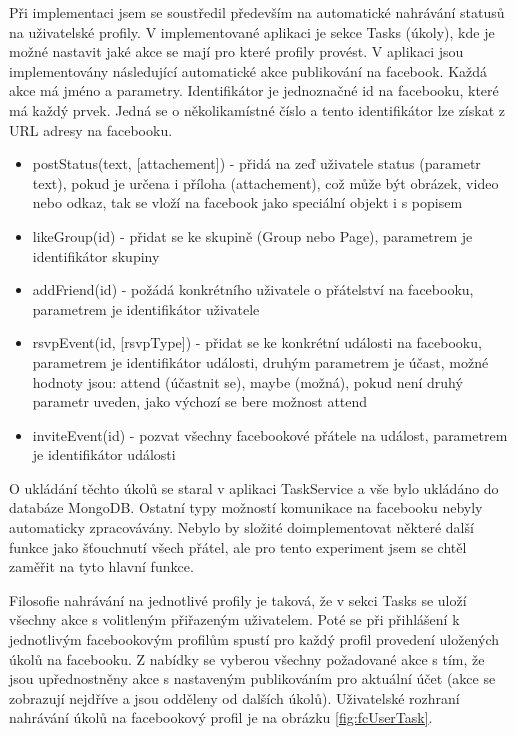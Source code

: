 \documentclass[thesis=M,czech]{FITthesis}[2013/05/10]
\begin{document}
Při implementaci jsem se soustředil především na automatické nahrávání statusů na uživatelské profily. V implementované aplikaci je sekce Tasks (úkoly), kde je možné nastavit jaké akce se mají pro které profily provést. V aplikaci jsou implementovány následující automatické akce publikování na facebook. Každá akce má jméno a parametry. Identifikátor je jednoznačné id na facebooku, které má každý prvek. Jedná se o několikamístné číslo a tento identifikátor lze získat z URL adresy na facebooku.

\begin{itemize}
  \item postStatus(text, [attachement]) - přidá na zeď uživatele status (parametr text), pokud je určena i příloha (attachement), což může být obrázek, video nebo odkaz, tak se vloží na facebook jako speciální objekt i s popisem
  \item likeGroup(id) - přidat se ke skupině (Group nebo Page), parametrem je identifikátor skupiny 
  \item addFriend(id) - požádá konkrétního uživatele o přátelství na facebooku, parametrem je identifikátor uživatele
  \item rsvpEvent(id, [rsvpType]) - přidat se ke konkrétní události na facebooku, parametrem je identifikátor události, druhým parametrem je účast, možné hodnoty jsou: attend (účastnit se), maybe (možná), pokud není druhý parametr uveden, jako výchozí se bere možnost attend
  \item inviteEvent(id) - pozvat všechny facebookové přátele na událost, parametrem je identifikátor události
\end{itemize}

O ukládání těchto úkolů se staral v aplikaci TaskService a vše bylo ukládáno do databáze MongoDB. Ostatní typy možností komunikace na facebooku nebyly automaticky zpracovávány. Nebylo by složité doimplementovat některé další funkce jako šťouchnutí všech přátel, ale pro tento experiment jsem se chtěl zaměřit na tyto hlavní funkce. 

Filosofie nahrávání na jednotlivé profily je taková, že v sekci Tasks se uloží všechny akce s volitleným přiřazeným uživatelem. Poté se při přihlášení k jednotlivým facebookovým profilům spustí pro každý profil provedení uložených úkolů na facebooku. Z nabídky se vyberou všechny požadované akce s tím, že jsou upřednostněny akce s nastaveným publikováním pro aktuální účet (akce se zobrazují nejdříve a jsou odděleny od dalších úkolů). Uživatelské rozhraní nahrávání úkolů na facebookový profil je na obrázku \ref{fig:fcUserTask}.
\end{document}

